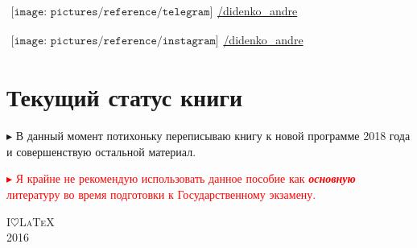 \begin{flushleft}
\begin{itemize}[wide, labelwidth=!, labelindent=0pt, label=$\blacktriangleright$, noitemsep]
\qquad\href{https://t.me/didenko_andre}{$
\begin{array}{l}
\texttt{[image: pictures/reference/telegram]}
\end{array}
$\large /didenko\_\!andre}

\qquad\href{https://instagram.com/didenko_andre}{$
    \begin{array}{l}
    \texttt{[image: pictures/reference/instagram]}
    \end{array}
$\large /didenko\_\!andre}
\vspace*{-1\baselineskip}  
\end{itemize}

\section*{\Large Текущий статус книги}

$\blacktriangleright$ В данный момент потихоньку переписываю книгу к новой программе 2018 года и совершенствую остальной материал.

\smallskip

\vfill

\textcolor{red}{
$\blacktriangleright$ Я крайне не рекомендую использовать данное пособие как \textit{\textbf{основную}} литературу во время подготовки к Государственному экзамену.
}

\end{flushleft}

\medskip
\vfill
{\huge\scshape I\;$\heartsuit$\;\LaTeX}\\[0.5\baselineskip]
{\LARGE\scshape 2016}\par
\restoregeometry
\endgroup
\newpage